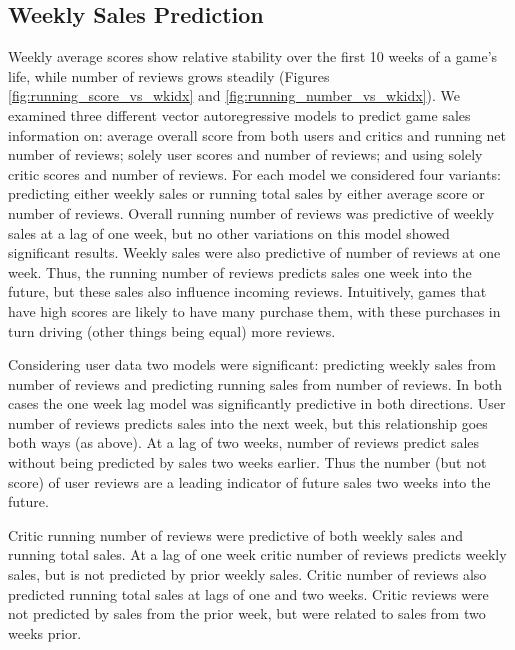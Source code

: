 \documentclass[letterpaper]{article}
\begin{document}
\subsection{Weekly Sales Prediction}
Weekly average scores show relative stability over the first 10 weeks of a game's life, while number of reviews grows steadily (Figures \ref{fig:running_score_vs_wkidx} and \ref{fig:running_number_vs_wkidx}). We examined three different vector autoregressive models to predict game sales information on: average overall score from both users and critics and running net number of reviews; solely user scores and number of reviews; and using solely critic scores and number of reviews. For each model we considered four variants: predicting either weekly sales or running total sales by either average score or number of reviews. Overall running number of reviews was predictive of weekly sales at a lag of one week, but no other variations on this model showed significant results. Weekly sales were also predictive of number of reviews at one week. Thus, the running number of reviews predicts sales one week into the future, but these sales also influence incoming reviews. Intuitively, games that have high scores are likely to have many purchase them, with these purchases in turn driving (other things being equal) more reviews.

\label{fig:running_score_vs_wkidx}

\label{fig:running_number_vs_wkidx}

Considering user data two models were significant: predicting weekly sales from number of reviews and predicting running sales from number of reviews. In both cases the one week lag model was significantly predictive in both directions. User number of reviews predicts sales into the next week, but this relationship goes both ways (as above). At a lag of two weeks, number of reviews predict sales without being predicted by sales two weeks earlier. Thus the number (but not score) of user reviews are a leading indicator of future sales two weeks into the future.

Critic running number of reviews were predictive of both weekly sales and running total sales. At a lag of one week critic number of reviews predicts weekly sales, but is not predicted by prior weekly sales. Critic number of reviews also predicted running total sales at lags of one and two weeks. Critic reviews were not predicted by sales from the prior week, but were related to sales from two weeks prior.
\end{document}
